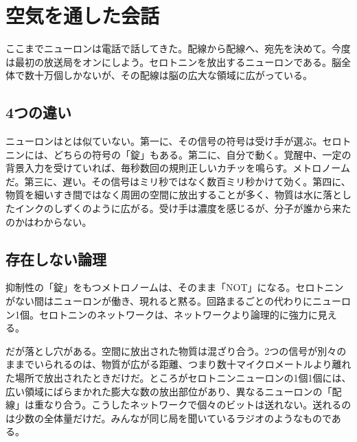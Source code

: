 \chapter{空気を通した会話}


ここまでニューロンは電話で話してきた。配線から配線へ、宛先を決めて。今度は最初の放送局をオンにしよう。セロトニンを放出するニューロンである。脳全体で数十万個しかないが、その配線は脳の広大な領域に広がっている。

\section*{4つの違い}

ニューロンはとは似ていない。第一に、その信号の符号は受け手が選ぶ。セロトニンには、どちらの符号の「錠」もある。第二に、自分で動く。覚醒中、一定の背景入力を受けていれば、毎秒数回の規則正しいカチッを鳴らす。メトロノームだ。第三に、遅い。その信号はミリ秒ではなく数百ミリ秒かけて効く。第四に、物質を細いすき間ではなく周囲の空間に放出することが多く、物質は水に落としたインクのしずくのように広がる。受け手は濃度を感じるが、分子が誰から来たのかはわからない。

\section*{存在しない論理}

抑制性の「錠」をもつメトロノームは、そのまま「NOT」になる。セロトニンがない間はニューロンが働き、現れると黙る。回路まるごとの代わりにニューロン1個。セロトニンのネットワークは、ネットワークより論理的に強力に見える。

だが落とし穴がある。空間に放出された物質は混ざり合う。2つの信号が別々のままでいられるのは、物質が広がる距離、つまり数十マイクロメートルより離れた場所で放出されたときだけだ。ところがセロトニンニューロンの1個1個には、広い領域にばらまかれた膨大な数の放出部位があり、異なるニューロンの「配線」は重なり合う。こうしたネットワークで個々のビットは送れない。送れるのは少数の全体量だけだ。みんなが同じ局を聞いているラジオのようなものである。


